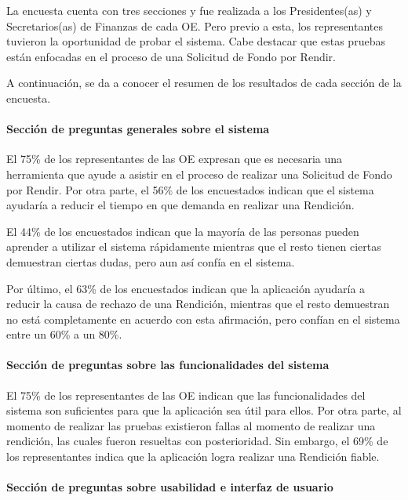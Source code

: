 La encuesta cuenta con tres secciones y fue realizada a los Presidentes(as) y Secretarios(as) de Finanzas de cada OE. Pero previo a esta, los representantes tuvieron la oportunidad de probar el sistema. Cabe destacar que estas pruebas están enfocadas en el proceso de una Solicitud de Fondo por Rendir.

A continuación, se da a conocer el resumen de los resultados de cada sección de la encuesta.

\paragraph{Sección de preguntas generales sobre el sistema}

El 75\% de los representantes de las OE expresan que es necesaria una herramienta que ayude a asistir en el proceso de realizar una Solicitud de Fondo por Rendir. Por otra parte, el 56\% de los encuestados indican que el sistema ayudaría a reducir el tiempo en que demanda en realizar una Rendición.

El 44\% de los encuestados indican que la mayoría de las personas pueden aprender a utilizar el sistema rápidamente mientras que el resto tienen ciertas demuestran ciertas dudas, pero aun así confía en el sistema.

Por último, el 63\% de los encuestados indican que la aplicación ayudaría a reducir la causa de rechazo de una Rendición, mientras que el resto demuestran no está completamente en acuerdo con esta afirmación, pero confían en el sistema entre un 60\% a un 80\%.

\paragraph{Sección de preguntas sobre las funcionalidades del sistema}

El 75\% de los representantes de las OE indican que las funcionalidades del sistema son suficientes para que la aplicación sea útil para ellos. Por otra parte, al momento de realizar las pruebas existieron fallas al momento de realizar una rendición, las cuales fueron resueltas con posterioridad. Sin embargo, el 69\% de los representantes indica que la aplicación logra realizar una Rendición fiable.

\paragraph{Sección de preguntas sobre usabilidad e interfaz de usuario}

